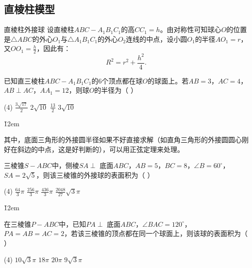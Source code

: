 \subsection{直棱柱模型}
\begin{theorem}{直棱柱外接球}
    设直棱柱$ABC - A_1B_1C_1$的高$CC_1 = h$。由对称性可知球心$O$的位置是$\triangle ABC$的外心$O_1$与$\triangle A_1B_1C_1$的外心$O_2$连线的中点，设小圆$O_1$的半径$AO_1 = r$，又$OO_1 = \frac{h}{2}$，因此有：
    \[
        R^2 = r^2 + \frac{h^2}{4}.
    \]

    \begin{figure} [H]
        \centering
        \resizebox{0.4\textwidth}{!}{}
    \end{figure}
\end{theorem}

\pagebreak

\begin{example}
    已知直三棱柱$ABC - A_1B_1C_1$的6个顶点都在球$O$的球面上。若$AB = 3$，$AC = 4$，$AB \perp AC$，$AA_1 = 12$，则球$O$的半径为（ \hspace{1.5cm}）
    \begin{tasks}(4)
        \task $\frac{3\sqrt{17}}{2}$
        \task $2\sqrt{10}$
        \task $\frac{13}{2}$
        \task $3\sqrt{10}$
    \end{tasks}
\end{example}

\v{12em}

其中，底面三角形的外接圆半径如果不好直接求解（如直角三角形的外接圆圆心刚好在斜边的中点，这是好判断的），可以用正弦定理来处理。

\begin{example}
    三棱锥$S - ABC$中，侧棱$SA \perp$ 底面$ABC$，$AB = 5$，$BC = 8$，$\angle B = 60^\circ$，$SA = 2\sqrt{5}$，则该三棱锥的外接球的表面积为（ \hspace{1.5cm}）
    \begin{tasks}(4)
        \task $\frac{64}{3}\pi$
        \task $\frac{256}{3}\pi$
        \task $\frac{436}{3}\pi$
        \task $\frac{2048}{27}\sqrt{3}\pi$
    \end{tasks}
\end{example}

\v{12em}

\begin{example}
    在三棱锥$P - ABC$中，已知$PA \perp$ 底面$ABC$，$\angle BAC = 120^\circ$，$PA = AB = AC = 2$，若该三棱锥的顶点都在同一个球面上，则该球的表面积为（\hspace{1.5cm} ）
    \begin{tasks}(4)
        \task $10\sqrt{3}\pi$
        \task $18\pi$
        \task $20\pi$
        \task $9\sqrt{3}\pi$
    \end{tasks}
\end{example}

